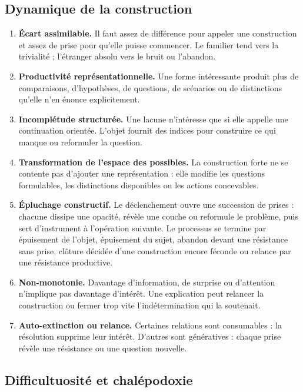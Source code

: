 \documentclass[11pt,a4paper]{article}
\begin{document}
\subsection{Dynamique de la construction}

\begin{enumerate}[resume]
  \item \textbf{Écart assimilable.} Il faut assez de différence pour appeler
        une construction et assez de prise pour qu'elle puisse commencer. Le
        familier tend vers la trivialité ; l'étranger absolu vers le bruit ou
        l'abandon.
  \item \textbf{Productivité représentationnelle.} Une forme intéressante
        produit plus de comparaisons, d'hypothèses, de questions, de scénarios
        ou de distinctions qu'elle n'en énonce explicitement.
  \item \textbf{Incomplétude structurée.} Une lacune n'intéresse que si elle
        appelle une continuation orientée. L'objet fournit des indices pour
        construire ce qui manque ou reformuler la question.
  \item \textbf{Transformation de l'espace des possibles.} La construction
        forte ne se contente pas d'ajouter une représentation : elle modifie
        les questions formulables, les distinctions disponibles ou les actions
        concevables.
  \item \textbf{Épluchage constructif.} Le déclenchement ouvre une succession
        de prises : chacune dissipe une opacité, révèle une couche ou reformule
        le problème, puis sert d'instrument à l'opération suivante. Le processus
        se termine par épuisement de l'objet, épuisement du sujet, abandon devant
        une résistance sans prise, clôture décidée d'une construction encore
        féconde ou relance par une résistance productive.
  \item \textbf{Non-monotonie.} Davantage d'information, de surprise ou
        d'attention n'implique pas davantage d'intérêt. Une explication peut
        relancer la construction ou fermer trop vite l'indétermination qui la
        soutenait.
  \item \textbf{Auto-extinction ou relance.} Certaines relations sont
        consumables : la résolution supprime leur intérêt. D'autres sont
        génératives : chaque prise révèle une résistance ou une question
        nouvelle.
\end{enumerate}

\subsection{Difficultuosité et chalépodoxie}
\end{document}
